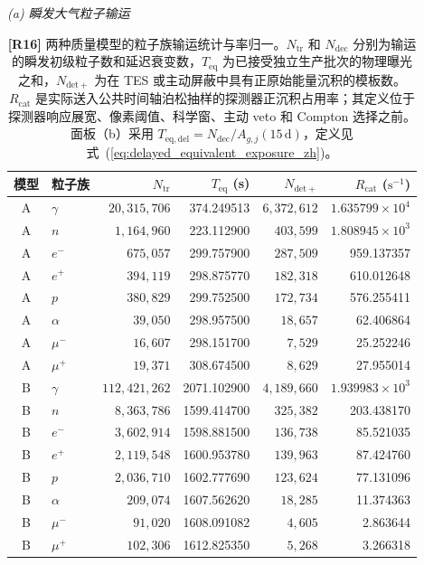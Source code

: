 \documentclass[11pt]{article}
\begin{document}
\begingroup
\color{revisionblue}
\begin{table}[!htbp]
\color{revisionblue}
\centering
{}
\caption{\textbf{[R16]} 两种质量模型的粒子族输运统计与率归一。$N_{\mathrm{tr}}$ 和 $N_{\mathrm{dec}}$ 分别为输运的瞬发初级粒子数和延迟衰变数，$T_{\mathrm{eq}}$ 为已接受独立生产批次的物理曝光之和，$N_{\mathrm{det+}}$ 为在 TES 或主动屏蔽中具有正原始能量沉积的模板数。$R_{\mathrm{cat}}$ 是实际送入公共时间轴泊松抽样的探测器正沉积占用率；其定义位于探测器响应展宽、像素阈值、科学窗、主动 veto 和 Compton 选择之前。面板（b）采用 $T_{\mathrm{eq,del}}=N_{\mathrm{dec}}/A_{g,j}(15\,\mathrm d)$，定义见式~(\ref{eq:delayed_equivalent_exposure_zh})。}
\label{tab:background_source_model}
\scriptsize
\setlength{\tabcolsep}{5.0pt}
\renewcommand{\arraystretch}{0.92}
\noindent\textit{(a) 瞬发大气粒子输运}\par\vspace{0.20em}
\begin{tabular}{clrrrr}
\toprule
模型 & 粒子族 & $N_{\mathrm{tr}}$ & $T_{\mathrm{eq}}$ (s)
& $N_{\mathrm{det+}}$ & $R_{\mathrm{cat}}$ ($\mathrm{s^{-1}}$) \\
\midrule
A & $\gamma$ & $20{,}315{,}706$ & 374.249513 & $6{,}372{,}612$ & $1.635799\times10^{4}$ \\
A & $n$ & $1{,}164{,}960$ & 223.112900 & $403{,}599$ & $1.808945\times10^{3}$ \\
A & $e^-$ & $675{,}057$ & 299.757900 & $287{,}509$ & 959.137357 \\
A & $e^+$ & $394{,}119$ & 298.875770 & $182{,}318$ & 610.012648 \\
A & $p$ & $380{,}829$ & 299.752500 & $172{,}734$ & 576.255411 \\
A & $\alpha$ & $39{,}050$ & 298.957500 & $18{,}657$ & 62.406864 \\
A & $\mu^-$ & $16{,}607$ & 298.151700 & $7{,}529$ & 25.252246 \\
A & $\mu^+$ & $19{,}371$ & 308.674500 & $8{,}629$ & 27.955014 \\
\addlinespace[0.25em]
B & $\gamma$ & $112{,}421{,}262$ & 2071.102900 & $4{,}189{,}660$ & $1.939983\times10^{3}$ \\
B & $n$ & $8{,}363{,}786$ & 1599.414700 & $325{,}382$ & 203.438170 \\
B & $e^-$ & $3{,}602{,}914$ & 1598.881500 & $136{,}738$ & 85.521035 \\
B & $e^+$ & $2{,}119{,}548$ & 1600.953780 & $139{,}963$ & 87.424760 \\
B & $p$ & $2{,}036{,}710$ & 1602.777690 & $123{,}624$ & 77.131096 \\
B & $\alpha$ & $209{,}074$ & 1607.562620 & $18{,}285$ & 11.374363 \\
B & $\mu^-$ & $91{,}020$ & 1608.091082 & $4{,}605$ & 2.863644 \\
B & $\mu^+$ & $102{,}306$ & 1612.825350 & $5{,}268$ & 3.266318 \\
\bottomrule
\end{tabular}


\end{table}
\end{document}
